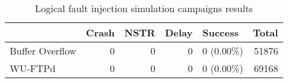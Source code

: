 \begin{table}[H]
\centering
\caption{Logical fault injection simulation campaigns results}
\label{table:end_sim_by_status_simple_parity_single_bitflip_spatial}
\begin{tabular}{lrrrlr}
\toprule
 & Crash & NSTR & Delay & Success & Total \\
\midrule
Buffer Overflow & 0 & 0 & 0 & 0 (0.00\%) & 51876 \\
WU-FTPd & 0 & 0 & 0 & 0 (0.00\%) & 69168 \\
\bottomrule
\end{tabular}
\end{table}
